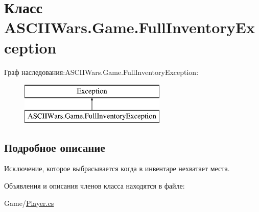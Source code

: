 \hypertarget{class_a_s_c_i_i_wars_1_1_game_1_1_full_inventory_exception}{}\section{Класс A\+S\+C\+I\+I\+Wars.\+Game.\+Full\+Inventory\+Exception}
\label{class_a_s_c_i_i_wars_1_1_game_1_1_full_inventory_exception}
Граф наследования\+:A\+S\+C\+I\+I\+Wars.\+Game.\+Full\+Inventory\+Exception\+:\begin{figure}[H]
\begin{center}
\leavevmode
\includegraphics[height=2.000000cm]{class_a_s_c_i_i_wars_1_1_game_1_1_full_inventory_exception}
\end{center}
\end{figure}


\subsection{Подробное описание}
Исключение, которое выбрасывается когда в инвентаре нехватает места. 

Объявления и описания членов класса находятся в файле\+:\begin{DoxyCompactItemize}
\item 
Game/\hyperlink{_player_8cs}{Player.\+cs}\end{DoxyCompactItemize}
